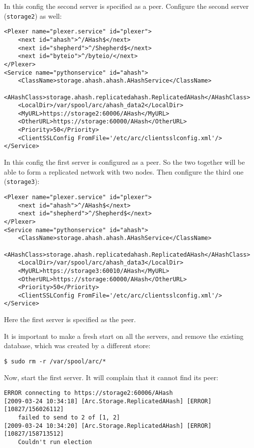 \documentclass{article}
\begin{document}
In this config the second server is specified as a peer. Configure the second server (\verb!storage2!) as well:

\begin{verbatim}
<Plexer name="plexer.service" id="plexer">
    <next id="ahash">^/AHash$</next>
    <next id="shepherd">^/Shepherd$</next>
    <next id="byteio">^/byteio/</next>
</Plexer>
<Service name="pythonservice" id="ahash">
    <ClassName>storage.ahash.ahash.AHashService</ClassName>
    <AHashClass>storage.ahash.replicatedahash.ReplicatedAHash</AHashClass>
    <LocalDir>/var/spool/arc/ahash_data2</LocalDir>
    <MyURL>https://storage2:60006/AHash</MyURL>
    <OtherURL>https://storage:60000/AHash</OtherURL>
    <Priority>50</Priority>
    <ClientSSLConfig FromFile='/etc/arc/clientsslconfig.xml'/>
</Service>
\end{verbatim}

In this config the first server is configured as a peer. So the two together will be able to form a replicated network with two nodes. Then configure the third one (\verb!storage3!):

\begin{verbatim}
<Plexer name="plexer.service" id="plexer">
    <next id="ahash">^/AHash$</next>
    <next id="shepherd">^/Shepherd$</next>
</Plexer>
<Service name="pythonservice" id="ahash">
    <ClassName>storage.ahash.ahash.AHashService</ClassName>
    <AHashClass>storage.ahash.replicatedahash.ReplicatedAHash</AHashClass>
    <LocalDir>/var/spool/arc/ahash_data3</LocalDir>
    <MyURL>https://storage3:60010/AHash</MyURL>
    <OtherURL>https://storage:60000/AHash</OtherURL>
    <Priority>50</Priority>
    <ClientSSLConfig FromFile='/etc/arc/clientsslconfig.xml'/>
</Service>
\end{verbatim}

Here the first server is specified as the peer.

It is important to make a fresh start on all the servers, and remove the existing database, which was created by a different store:
\begin{verbatim}
$ sudo rm -r /var/spool/arc/*
\end{verbatim}

Now, start the first server. It will complain that it cannot find its peer:
\begin{verbatim}
ERROR connecting to https://storage2:60006/AHash
[2009-03-24 10:34:18] [Arc.Storage.ReplicatedAHash] [ERROR] [10827/156026112]
    failed to send to 2 of [1, 2]
[2009-03-24 10:34:20] [Arc.Storage.ReplicatedAHash] [ERROR] [10827/158713512]
    Couldn't run election
\end{verbatim}
\end{document}
